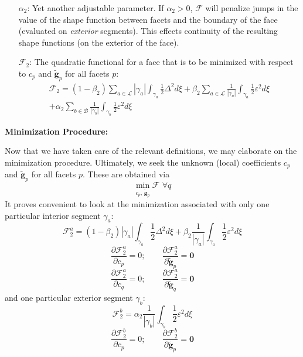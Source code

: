 \documentclass[11pt]{article} %
\begin{document}
\begin{itemize}
	\item[$\alpha_2$:] Yet another adjustable parameter. If $\alpha_2 > 0$, $\mathcal{F}$ will penalize jumps in the value of the shape function between facets and the boundary of the face (evaluated on \textit{exterior} segments). This effects continuity of the resulting shape functions (on the exterior of the face).
	\item[$\mathcal{F}_2$:] The quadratic functional for a face that is to be minimized with respect to $c_p$ and $\tilde{\mathbf{g}}_p$ for all facets $p$:
	\begin{eqnarray}
	\mathcal{F}_2 = (1-\beta_2) \sum_{a \in \mathcal{L}} | \gamma_a | \int_{\gamma_a} \frac{1}{2} \Delta^2 d \xi + \beta_2 \sum_{a \in \mathcal{L}} \frac{1}{| \gamma_a |} \int_{\gamma_a} \frac{1}{2} \varepsilon^2 d \xi \nonumber \\ + \alpha_2 \sum_{b \in \mathcal{B}} \frac{1}{| \gamma_b |} \int_{\gamma_b} \frac{1}{2} \varepsilon^2 d \xi
\end{eqnarray}
\end{itemize}

\begin{center}
\textbf{Minimization Procedure:}
\end{center}

Now that we have taken care of the relevant definitions, we may elaborate on the minimization procedure. Ultimately, we seek the unknown (local) coefficients $c_p$ and $\tilde{\mathbf{g}}_p$ for all facets $p$. These are obtained via
\begin{equation}
	\min_{c_p, \, \tilde{\mathbf{g}}_p} \mathcal{F} \, \, \forall q
\end{equation}
It proves convenient to look at the minimization associated with only one particular interior segment $\gamma_a$:
\begin{equation}
	\mathcal{F}^a_2 = (1-\beta_2) | \gamma_a | \int_{\gamma_a} \frac{1}{2} \Delta^2 d \xi + \beta_2 \frac{1}{| \gamma_a |} \int_{\gamma_a} \frac{1}{2} \varepsilon^2 d \xi
\end{equation}
\begin{equation}
	\frac{\partial \mathcal{F}^a_2}{\partial c_p} = 0; \qquad \frac{\partial \mathcal{F}^a_2}{\partial \tilde{\mathbf{g}}_p} = \mathbf{0}
\end{equation}
\begin{equation}
	\frac{\partial \mathcal{F}^a_2}{\partial c_q} = 0; \qquad \frac{\partial \mathcal{F}^a_2}{\partial \tilde{\mathbf{g}}_q} = \mathbf{0}
\end{equation}
and one particular exterior segment $\gamma_b$:
\begin{equation}
	\mathcal{F}^b_2 = \alpha_2 \frac{1}{| \gamma_b |} \int_{\gamma_b} \frac{1}{2} \varepsilon^2 d \xi
\end{equation}
\begin{equation}
	\frac{\partial \mathcal{F}^b_2}{\partial c_p} = 0; \qquad \frac{\partial \mathcal{F}^b_2}{\partial \tilde{\mathbf{g}}_p} = \mathbf{0}
\end{equation}
\end{document}
